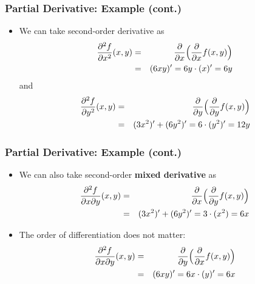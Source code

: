 \documentclass[pdflatex, 12pt]{beamer}
\begin{document}
\begin{frame}
\frametitle{Partial Derivative: Example (cont.)}
\begin{itemize}
\item We can take second-order derivative as
 \begin{eqnarray}
 \frac{\partial^2 f}{\partial x^2}(x, y) &=& \frac{\partial}{\partial x} \Big(\frac{\partial}{\partial x} f(x, y)\Big) \notag \\
 &=& (6xy)' = 6y \cdot (x)' = 6y \notag 
 \end{eqnarray}
 and
 \begin{eqnarray}
 \frac{\partial^2 f}{\partial y^2}(x, y) &=& \frac{\partial}{\partial y} \Big(\frac{\partial}{\partial y} f(x, y)\Big) \notag \\
 &=& (3x^2)' + (6y^2)' = 6 \cdot (y^2)' = 12y \notag 
 \end{eqnarray}
\end{itemize}
\end{frame}

\begin{frame}
\frametitle{Partial Derivative: Example (cont.)}
\begin{itemize}
\item We can also take second-order \textbf{mixed derivative} as
 \begin{eqnarray}
 \frac{\partial^2 f}{\partial x \partial y}(x, y) &=& \frac{\partial}{\partial x} \Big(\frac{\partial}{\partial y} f(x, y)\Big) \notag \\
 &=& (3x^2)' + (6y^2)' = 3 \cdot (x^2) = 6x \notag 
 \end{eqnarray}
\vspace{0.2cm}
\item The order of differentiation does not matter:
 \begin{eqnarray}
 \frac{\partial^2 f}{\partial x \partial y}(x, y) &=& \frac{\partial}{\partial y} \Big(\frac{\partial}{\partial x} f(x, y)\Big) \notag \\
 &=& (6xy)' = 6x \cdot (y)' = 6x \notag 
 \end{eqnarray}
\end{itemize}
\end{frame}
\end{document}
